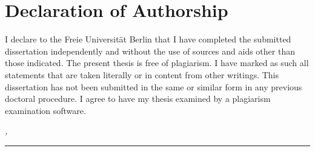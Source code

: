 \chapter*{Declaration of Authorship}
\label{sec:declaration}
\thispagestyle{empty}

I declare to the Freie Universität Berlin that I have completed the submitted dissertation
independently and without the use of sources and aids other than those indicated. The present
thesis is free of plagiarism. I have marked as such all statements that are taken literally or in
content from other writings. This dissertation has not been submitted in the same or similar form in
any previous doctoral procedure.
I agree to have my thesis examined by a plagiarism examination software. 

\bigskip

\noindent\textit{\thesisUniversityCity, \thesisDate}

\smallskip

\begin{flushright}
	\begin{minipage}{5cm}
		\rule{\textwidth}{1pt}
		\centering\thesisName
	\end{minipage}
\end{flushright}


